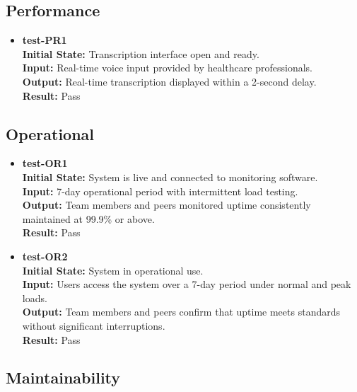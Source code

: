 \documentclass[12pt, titlepage]{article}
\begin{document}
\subsection{Performance} \label{section:4.3}

\begin{itemize}
\item \textbf{test-PR1} \label{test-PR1} \\
\textbf{Initial State:} Transcription interface open and ready. \\
\textbf{Input:} Real-time voice input provided by healthcare professionals. \\
\textbf{Output:} Real-time transcription displayed within a 2-second delay. \\
\textbf{Result:} Pass \\
\end{itemize}

\subsection{Operational} \label{section:4.4}

\begin{itemize}
\item \textbf{test-OR1} \label{test-OR1} \\
\textbf{Initial State:} System is live and connected to monitoring software. \\
\textbf{Input:} 7-day operational period with intermittent load testing. \\
\textbf{Output:} Team members and peers monitored uptime consistently maintained at 99.9\% or above. \\
\textbf{Result:} Pass \\

\item \textbf{test-OR2} \label{test-OR2} \\
\textbf{Initial State:} System in operational use. \\
\textbf{Input:} Users access the system over a 7-day period under normal and peak loads. \\
\textbf{Output:} Team members and peers confirm that uptime meets standards without significant interruptions. \\
\textbf{Result:} Pass \\
\end{itemize}

\subsection{Maintainability} \label{section:4.5}
\end{document}

